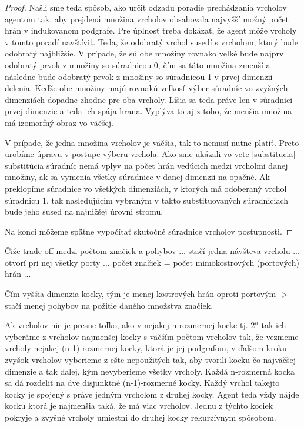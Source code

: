 \begin{proof}
Našli sme teda spôsob, ako určiť odzadu poradie prechádzania vrcholov
agentom tak, aby prejdená množina vrcholov obsahovala najvyšší možný počet
hrán v indukovanom podgrafe. Pre úplnosť treba dokázať, že agent môže
vrcholy v tomto poradí navštíviť. Teda, že odobratý vrchol susedí s
vrcholom, ktorý bude odobratý najbližšie.
V prípade, že sú obe množiny rovnako veľké bude najprv odobratý prvok z
množiny so súradnicou 0, čím sa táto množina zmenší a následne bude odobratý
prvok z množiny so súradnicou 1 v prvej dimenzii delenia. Keďže obe množiny
majú rovnakú veľkosť výber súradníc vo zvyšných dimenziách dopadne zhodne
pre oba vrcholy. Líšia sa teda práve len v súradnici prvej dimenzie a teda ich
spája hrana. Vyplýva to aj z toho, že menšia množina má izomorfný obraz vo
väčšej.

V prípade, že jedna množina vrcholov je väčšia, tak to nemusí nutne platiť.
Preto urobíme úpravu v postupe výberu vrchola. Ako sme ukázali vo vete
\ref{substitucia} substitúcia súradníc nemá vplyv na počet hrán vedúcich
medzi vrcholmi danej množiny, ak sa vymenia všetky súradnice v danej
dimenzii na opačné. Ak preklopíme súradnice vo všetkých dimenziách, v
ktorých má odoberaný vrchol súradnicu 1, tak nasledujúcim vybraným v takto
substituovaných súradniciach bude jeho sused na najnižšej úrovni stromu.

Na konci môžeme spätne vypočítať skutočné súradnice vrcholov postupnosti.

\iffalse
Ak vynecháme vrchol s nanižším počtom hrán, ktoré doň vedú, získame množinu
s najvyšším počtom hrán medzi $n-1$ vrcholmi?

\fi
\end{proof}

\iffalse
Čiže trade-off medzi počtom značiek a pohybov ... stačí jedna návšteva
vrcholu ... otvorí pri nej všetky porty ... počet značiek = počet 
mimokostrových
(portových) hrán ... 

Čím vyššia dimenzia kocky, tým je menej kostrových hrán oproti portovým ->
stačí menej pohybov na požitie daného množstva značiek.

Ak vrcholov nie je presne toľko, ako v nejakej n-rozmernej kocke tj. ${2}^{n}$
tak ich vyberáme z vrcholov najmenšej kocky s väčším počtom vrcholov tak, že
vezmeme vrcholy nejakej (n-1) rozmernej kocky, ktorá je jej podgrafom, v
ďalšom kroku zvyšok vrcholov vyberieme z ešte nepoužitých tak, aby tvorili kocku
čo najväčšej dimenzie a tak ďalej, kým nevyberieme všetky vrcholy. Každá
n-rozmerná kocka sa dá rozdeliť na dve disjunktné (n-1)-rozmerné kocky.
Každý vrchol takejto kocky je spojený s práve jedným vrcholom z druhej
kocky. Agent teda vždy nájde kocku ktorá je najmenšia taká, že má viac
vrcholov. Jednu z týchto kociek pokryje a zvyšné vrcholy umiestni do druhej
kocky rekurzívnym spôsobom.


